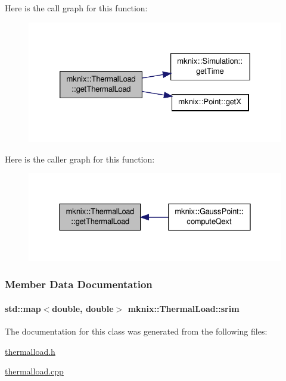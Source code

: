Here is the call graph for this function\-:\nopagebreak
\begin{figure}[H]
\begin{center}
\leavevmode
\includegraphics[width=324pt]{df/d32/classmknix_1_1_thermal_load_aa0c9087704913f2f675e4dd2da25661a_cgraph}
\end{center}
\end{figure}




Here is the caller graph for this function\-:\nopagebreak
\begin{figure}[H]
\begin{center}
\leavevmode
\includegraphics[width=328pt]{df/d32/classmknix_1_1_thermal_load_aa0c9087704913f2f675e4dd2da25661a_icgraph}
\end{center}
\end{figure}




\subsubsection{Member Data Documentation}
\hypertarget{classmknix_1_1_thermal_load_a96b2bf86fa9a1e4b2543c4c1f822dd0e}{
\paragraph[{srim}]{\setlength{\rightskip}{0pt plus 5cm}std\-::map$<$double, double$>$ mknix\-::\-Thermal\-Load\-::srim\hspace{0.3cm}{\ttfamily [protected]}}}\label{classmknix_1_1_thermal_load_a96b2bf86fa9a1e4b2543c4c1f822dd0e}


The documentation for this class was generated from the following files\-:\begin{DoxyCompactItemize}
\item 
\hyperlink{thermalload_8h}{thermalload.\-h}\item 
\hyperlink{thermalload_8cpp}{thermalload.\-cpp}\end{DoxyCompactItemize}
